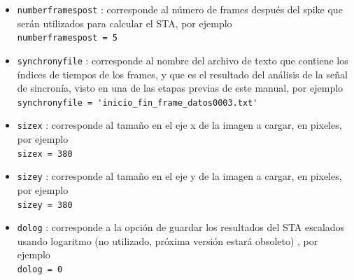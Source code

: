 \documentclass[10pt]{article}
\begin{document}
\begin{itemize}
\item \verb+numberframespost+ : corresponde al número de frames después del spike que serán utilizados para calcular el STA, por ejemplo \\

\verb+numberframespost = 5+\\

\item \verb+synchronyfile+ : corresponde al nombre del archivo de texto que contiene los índices de tiempos de los frames, y que es el resultado del análisis de la señal de sincronía, visto en una de las etapas previas de este manual, por ejemplo \\

\verb+synchronyfile = 'inicio_fin_frame_datos0003.txt'+ \\

\item \verb+sizex+  : corresponde al tamaño en el eje x de la imagen a cargar, en pixeles, por ejemplo \\

\verb+sizex = 380+ \\

\item \verb+sizey+  : corresponde al tamaño en el eje y de la imagen a cargar, en pixeles, por ejemplo \\

\verb+sizey = 380+ \\

\item \verb+dolog+ : corresponde a la opción de guardar los resultados del STA escalados usando logaritmo (no utilizado, próxima versión estará obsoleto) , por ejemplo  \\

\verb+dolog = 0+ \\
\end{itemize}
\end{document}
